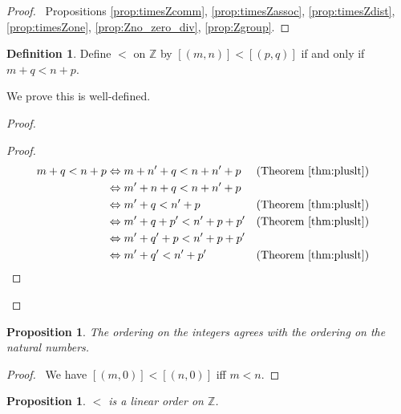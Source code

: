 \documentclass{book}
\let\qed\relax
\newtheorem{prop}[ax]{Proposition}
\theoremstyle{definition}
\newtheorem{df}[ax]{Definition}
\begin{document}
\begin{proof}
\pf\ Propositions \ref{prop:timesZcomm}, \ref{prop:timesZassoc}, \ref{prop:timesZdist}, \ref{prop:timesZone}, \ref{prop:Zno_zero_div}, \ref{prop:Zgroup}. \qed
\end{proof}

\begin{df}
Define $<$ on $\mathbb{Z}$ by $[(m,n)] < [(p,q)]$ if and only if $m + q < n + p$.

We prove this is well-defined.
\end{df}

\begin{proof}
\pf
{}
\begin{proof}
	\pf
	\begin{align*}
		m + q < n + p & \Leftrightarrow m + n' + q < n + n' + p & (\text{Theorem \ref{thm:pluslt}}) \\
		& \Leftrightarrow m' + n + q < n + n' + p \\
		& \Leftrightarrow m' + q < n' + p & (\text{Theorem \ref{thm:pluslt}}) \\
		& \Leftrightarrow m' + q + p' < n' + p + p' & (\text{Theorem \ref{thm:pluslt}}) \\
		& \Leftrightarrow m' + q' + p < n' + p + p' \\
		& \Leftrightarrow m' + q' < n' + p' & (\text{Theorem \ref{thm:pluslt}}) & \qed \\
	\end{align*}
\end{proof}
\end{proof}

\begin{prop}
The ordering on the integers agrees with the ordering on the natural numbers.
\end{prop}

\begin{proof}
\pf\ We have $[(m,0)] < [(n,0)]$ iff $m < n$. \qed
\end{proof}

\begin{prop}
$<$ is a linear order on $\mathbb{Z}$.
\end{prop}
\end{document}
